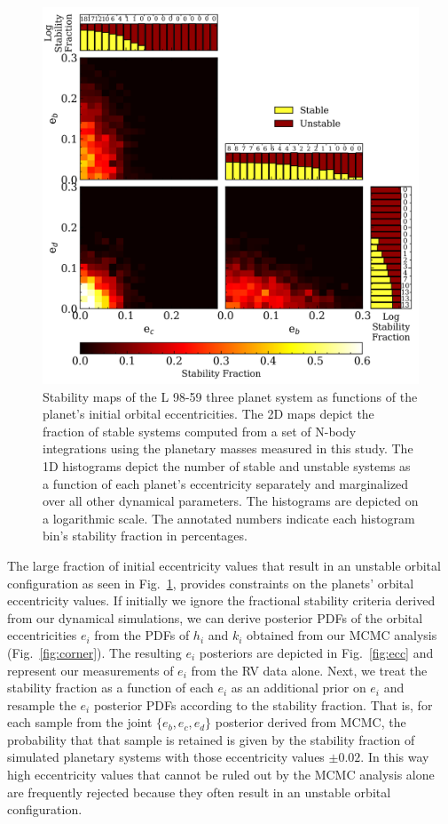 \documentclass[longauth]{aa}
\begin{document}
\begin{figure}
    \centering
    \includegraphics[width=\hsize]{stabilityv2.png}
    \caption{Stability maps of the L 98-59 three planet system as functions of the planet's initial orbital eccentricities. The 2D maps depict the fraction of stable systems computed from a set of N-body integrations using the planetary masses measured in this study. The 1D histograms depict the number of stable and unstable systems as a function of each planet's eccentricity separately and marginalized over all other dynamical parameters. The histograms are depicted on a logarithmic scale. The annotated numbers indicate each histogram bin's stability fraction in percentages.}
    \label{fig:stable}
\end{figure}

The large fraction of initial eccentricity values that result in an unstable orbital configuration as seen in Fig.~\ref{fig:stable}, provides constraints on the planets' orbital eccentricity values. If initially we ignore the fractional stability criteria derived from our dynamical simulations, we can derive posterior PDFs of the orbital eccentricities $e_i$ from the PDFs of $h_i$ and $k_i$ obtained from our MCMC analysis (Fig.~\ref{fig:corner}). The resulting $e_i$ posteriors are depicted in Fig.~\ref{fig:ecc} and represent our measurements of $e_i$ from the RV data alone. Next, we treat the stability fraction as a function of each $e_i$ as an additional prior on $e_i$ and resample the $e_i$ posterior PDFs according to the stability fraction. That is, for each sample from the joint $\{e_b,e_c,e_d \}$ posterior derived from MCMC, the probability that that sample is retained is given by the stability fraction of simulated planetary systems with those eccentricity values $\pm 0.02$. In this way high eccentricity values that cannot be ruled out by the MCMC analysis alone are frequently rejected because they often result in an unstable orbital configuration. 
\end{document}
